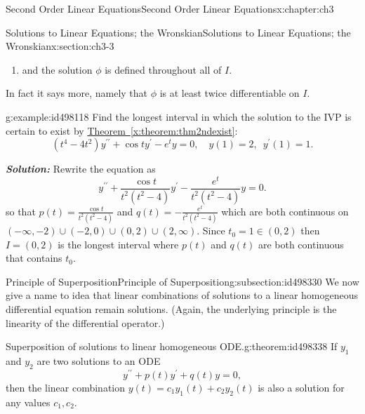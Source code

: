 \documentclass[oneside,10pt,]{book}
\newcommand{\xreffont}{\relax}
\newcommand{\alert}[1]{\textbf{\textit{#1}}}
\numberwithin{equation}{section}
\numberwithin{equation}{section}
\begin{document}
\begin{chapterptx}{Second Order Linear Equations}{}{Second Order Linear Equations}{}{}{x:chapter:ch3}
\begin{sectionptx}{Solutions to Linear Equations; the Wronskian}{}{Solutions to Linear Equations; the Wronskian}{}{}{x:section:ch3-3}
\begin{introduction}{}
\begin{enumerate}
\item{}and the solution \(\phi\) is defined throughout all of \(I\).%
\end{enumerate}
In fact it says more, namely that \(\phi\) is at least twice differentiable on \(I\).%
\begin{example}{}{g:example:id498118}%
Find the longest interval in which the solution to the IVP is certain to exist by \hyperref[x:theorem:thm2ndexist]{Theorem~{\xreffont\ref{x:theorem:thm2ndexist}}}:%
\begin{equation*}
\left(t^{4}-4t^{2}\right)y^{\prime\prime}+\cos ty^{\prime}-e^{t}y=0,\,\,\,\,\,\,y(1)=2,\,\,\,y^{\prime}(1)=1.
\end{equation*}
%
\par
\alert{Solution:} Rewrite the equation as%
\begin{equation*}
y^{\prime\prime}+\frac{\cos t}{t^{2}\left(t^{2}-4\right)}y^{\prime}-\frac{e^{t}}{t^{2}\left(t^{2}-4\right)}y=0.
\end{equation*}
so that \(p(t)=\frac{\cos t}{t^{2}\left(t^{2}-4\right)}\) and \(q(t)=-\frac{e^{t}}{t^{2}\left(t^{2}-4\right)}\) which are both continuous on \(\left(-\infty,-2\right)\cup\left(-2,0\right)\cup\left(0,2\right)\cup\left(2,\infty\right)\). Since \(t_{0}=1\in\left(0,2\right)\) then \(I=\left(0,2\right)\) is the longest interval where \(p(t)\) and \(q(t)\) are both continuous that contains \(t_{0}\).%
\end{example}
\end{introduction}%
%
%
\typeout{************************************************}
\typeout{************************************************}
%
\begin{subsectionptx}{Principle of Superposition}{}{Principle of Superposition}{}{}{g:subsection:id498330}
We now give a name to idea that linear combinations of solutions to a linear homogeneous differential equation remain solutions. (Again, the underlying principle is the linearity of the differential operator.)%
\begin{theorem}{Superposition of solutions to linear homogeneous ODE.}{}{g:theorem:id498338}%
If \(y_{1}\) and \(y_{2}\) are two solutions to an ODE%
\begin{equation*}
y^{\prime\prime}+p(t)y^{\prime}+q(t)y=0,
\end{equation*}
then the linear combination \(y(t)=c_{1}y_{1}(t)+c_{2}y_{2}(t)\) is also a solution for any values \(c_{1},c_{2}\).%
\end{theorem}

\end{subsectionptx}
\end{sectionptx}
\end{chapterptx}
\end{document}
